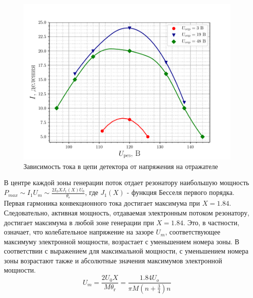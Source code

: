\begin{figure}[h!]
		\centering
		\includegraphics[width=\linewidth]{fig/task3b}
		\caption{Зависимость тока в цепи детектора от напряжения на отражателе}
		\label{fig:task3b}
\end{figure}


В центре каждой зоны генерации поток отдает резонатору наибольшую мощность $\displaystyle P_{max}\sim I_1 U_m \sim \frac{2I_0 XJ_1(X) U_0}{\theta _ { \text{г} }}$, где $J_1(X)$ - функция Бесселя первого порядка. Первая гармоника конвекционного тока достигает максимума при $X=1.84$. Следовательно, активная мощность, отдаваемая электронным потоком резонатору, достигает максимума в любой зоне генерации при $X=1.84$. Это, в частности, означает, что колебательное напряжение на зазоре $U_m$, соответствующее максимуму электронной мощности, возрастает с уменьшением номера зоны. В соответствии с выражением для максимальной мощности, с уменьшением номера зоны возрастают также и абсолютные значения максимумов электронной мощности. $$U_m=\frac{2U_0X}{M\theta _ { \text{г} }}=\frac{1.84 U_o}{\pi M(n+\frac 34)n}$$

